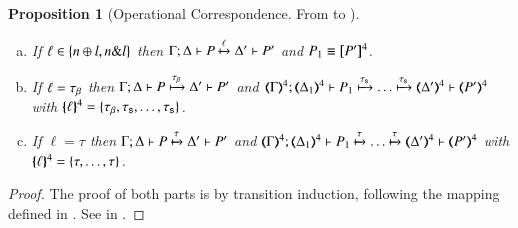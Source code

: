\documentclass[preprint,11pt]{elsarticle}
\newtheorem{proposition}{Proposition}[section]
\begin{document}
{{\begin{proposition}[Operational Correspondence. From \pHOp to \HOp]
\begin{enumerate}
\begin{enumerate}[a)]
				\item	If $\ell \in \{n \oplus l, n \& l\}$
					then
					$\Gamma; \Delta \vdash P \xmapsto{\ell} \Delta' \vdash P'$ and $P_1 \equiv [\!\![P']\!\!]^4$.

				\item	If $\ell = \tau_{\beta}$ then
					$\Gamma; \Delta \vdash P \xmapsto{\tau_{\beta}} \Delta' \vdash P'$ and
					$\horel{\tmap{\Gamma}{4}}{\tmap{\Delta_1}{4}}{P_1}{\hby{\stau} \dots \hby{\stau}}
					{\tmap{\Delta'}{4}}{\tmap{P'}{4}}$ with $\{\!\!\{\ell\}\!\!\}^{4} = \{\tau_{\beta}, \tau_{\mathsf{s}}, \dots, \tau_{\mathsf{s}}\}$.

				\item	If $\ell = \tau$ then
					$\Gamma; \Delta \vdash P \xmapsto{\tau} \Delta' \vdash P'$ and
					$\horel{\tmap{\Gamma}{4}}{\tmap{\Delta_1}{4}}{P_1}{\hby{\tau} \dots \hby{\tau}}
					{\tmap{\Delta'}{4}}{\tmap{P'}{4}}$ with $\{\!\!\{\ell\}\!\!\}^{4} = \{\tau, \dots, \tau\}$.
			\end{enumerate}
	\end{enumerate}
\end{proposition}

\begin{proof}
	The proof of both parts is by transition induction, following 
	the mapping defined in  .
	See 	 in .
\end{proof}	
	
}}
\end{document}
